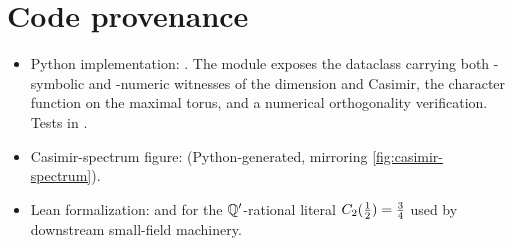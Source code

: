 \section{Code provenance}
\label{sec:su2-rep-codeanchor}

\begin{itemize}
  \item Python implementation:
    .  The module
    exposes the dataclass  carrying both
    -symbolic and -numeric witnesses
    of the dimension and Casimir, the character function on the
    maximal torus, and a numerical orthogonality verification.
    Tests in .
  \item Casimir-spectrum figure:
    (Python-generated, mirroring \cref{fig:casimir-spectrum}).
  \item Lean formalization:  and
     for the
    $\mathbb{Q}'$-rational literal $C_2(\tfrac12) = \tfrac34$ used by
    downstream small-field machinery.
\end{itemize}
